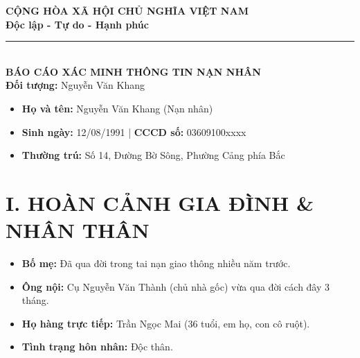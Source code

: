 \documentclass[12pt,a4paper]{article}
\begin{document}
\begin{center}
    \textbf{\Large CỘNG HÒA XÃ HỘI CHỦ NGHĨA VIỆT NAM}\\
    \textbf{\large Độc lập - Tự do - Hạnh phúc}\\
    \rule{8cm}{0.5pt}\\[0.5cm]
    
    \textbf{\LARGE BÁO CÁO XÁC MINH THÔNG TIN NẠN NHÂN}\\
    \textbf{Đối tượng:} Nguyễn Văn Khang
\end{center}

\vspace{0.3cm}

\begin{tcolorbox}[colback=gray!10!white,colframe=black!75!black,title=\textbf{THÔNG TIN CÁ NHÂN}]
\begin{itemize}[leftmargin=*]
    \item \textbf{Họ và tên:} Nguyễn Văn Khang (Nạn nhân)
    \item \textbf{Sinh ngày:} 12/08/1991 | \textbf{CCCD số:} 03609100xxxx
    \item \textbf{Thường trú:} Số 14, Đường Bờ Sông, Phường Cảng phía Bắc
\end{itemize}
\end{tcolorbox}

\section*{I. HOÀN CẢNH GIA ĐÌNH \& NHÂN THÂN}
\begin{itemize}
    \item \textbf{Bố mẹ:} Đã qua đời trong tai nạn giao thông nhiều năm trước.
    \item \textbf{Ông nội:} Cụ Nguyễn Văn Thành (chủ nhà gốc) vừa qua đời cách đây 3 tháng.
    \item \textbf{Họ hàng trực tiếp:} Trần Ngọc Mai (36 tuổi, em họ, con cô ruột).
    \item \textbf{Tình trạng hôn nhân:} Độc thân.
\end{itemize}
\end{document}
